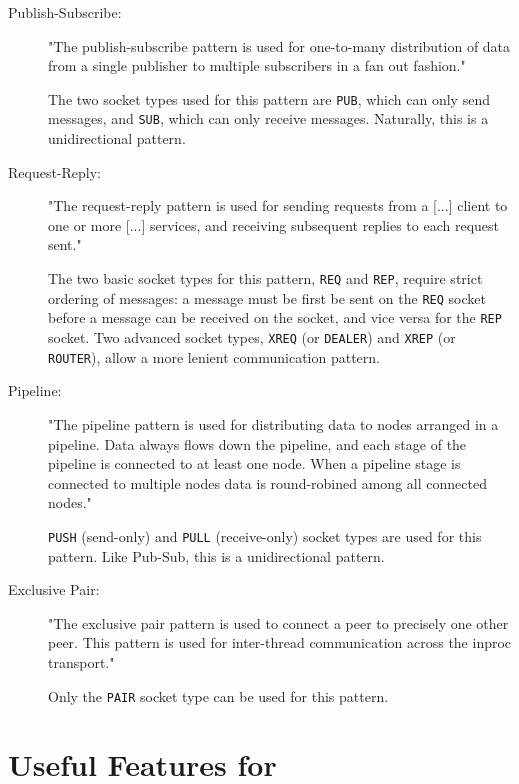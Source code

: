\begin{description}

\item[Publish-Subscribe:]

"The publish-subscribe pattern is used for one-to-many distribution of data from a single publisher to multiple
subscribers in a fan out fashion."

The two socket types used for this pattern are \texttt{PUB}, which can only send messages, and \texttt{SUB}, which can
only receive messages. Naturally, this is a unidirectional pattern.

\item[Request-Reply:]

"The request-reply pattern is used for sending requests from a [...] client to one or more [...] services, and receiving
subsequent replies to each request sent."

The two basic socket types for this pattern, \texttt{REQ} and \texttt{REP}, require strict ordering of messages: a
message must be first be sent on the \texttt{REQ} socket before a message can be received on the socket, and vice versa
for the \texttt{REP} socket. Two advanced socket types, \texttt{XREQ} (or \texttt{DEALER}) and \texttt{XREP} (or
\texttt{ROUTER}), allow a more lenient communication pattern.

\item[Pipeline:]

"The pipeline pattern is used for distributing data to nodes arranged in a pipeline. Data always flows down the
pipeline, and each stage of the pipeline is connected to at least one node. When a pipeline stage is connected to
multiple nodes data is round-robined among all connected nodes."

\texttt{PUSH} (send-only) and \texttt{PULL} (receive-only) socket types are used for this pattern. Like Pub-Sub, this is
a unidirectional pattern.

\item[Exclusive Pair:]

"The exclusive pair pattern is used to connect a peer to precisely one other peer. This pattern is used for inter-thread
communication across the inproc transport."

Only the \texttt{PAIR} socket type can be used for this pattern.

\end{description}

\section{Useful Features for \dcamp}

